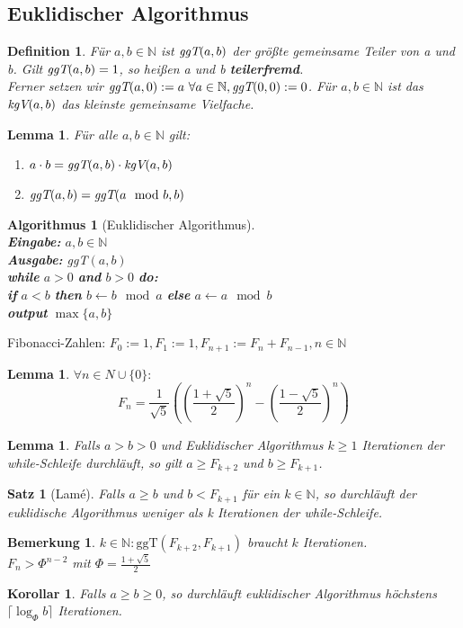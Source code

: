 \documentclass[12pt,a4paper]{article}
\theoremstyle{plain}
\newtheorem{Satz}[Theorem]{Satz}
\newtheorem{Lemma}[Theorem]{Lemma}
\newtheorem{Korollar}[Theorem]{Korollar}
\newtheorem{Definition}[Theorem]{Definition}
\newtheorem{Bemerkung}[Theorem]{Bemerkung}
\newtheorem{Algorithmus}[Theorem]{Algorithmus}
\newcommand{\herv}[1]{{\emph{\textbf{#1}}}}
\newcommand{\N}{\mathbb{N}}
\numberwithin{equation}{section}
\begin{document}
\subsection{Euklidischer Algorithmus}
\begin{Definition}
Für $a,b \in \N$ ist $\emph{ggT}(a,b)$ der größte gemeinsame Teiler von a und b. Gilt $\emph{ggT}(a,b)=1$, so heißen a und b \herv{teilerfremd}.\\
Ferner setzen wir $\emph{ggT}(a,0):=a\  \forall a \in \N, \emph{ggT}(0,0):=0$. Für $a,b\in \N$ ist das $\emph{kgV}(a,b)$ das kleinste gemeinsame Vielfache.
\end{Definition}
\begin{Lemma}
Für alle $a, b \in \N$ gilt:
\renewcommand{\labelenumi}{\emph{(\alph{enumi})}}
\begin{enumerate}
\item $a\cdot b = \emph{ggT}(a,b)\cdot \emph{kgV}(a,b)$
\item $\emph{ggT}(a,b)= \emph{ggT}(a\mod b, b)$
\end{enumerate}
\end{Lemma}
\begin{Algorithmus}[Euklidischer Algorithmus] \\
\textbf{Eingabe:} $a,b\in\N$\\
\textbf{Ausgabe:} ggT$(a,b)$\\
\textbf{while} $a>0$ \textbf{and} $b>0$ \textbf{do:}\\
\text{\qquad}\textbf{if} $a<b$ \textbf{then} $b\leftarrow b\mod a$ \textbf{else} $a\leftarrow a\mod b$\\
\textbf{output} $\max\{a,b\}$
\end{Algorithmus}
Fibonacci-Zahlen: $F_0:=1, F_1:=1, F_{n+1}:=F_n+F_{n-1}, n\in\N$
\begin{Lemma} $\forall n\in N\cup\{0\}:$\\
\[ F_n=\frac{1}{\sqrt{5}}\left(\left(\frac{1+\sqrt{5}}{2}\right)^n-\left(\frac{1-\sqrt{5}}{2}\right)^n \right) \]
\end{Lemma}
\begin{Lemma}
Falls $a>b>0$ und Euklidischer Algorithmus $k\geq 1$ Iterationen der while-Schleife durchläuft, so gilt $a\geq F_{k+2}$ und $b\geq F_{k+1}$.
\end{Lemma}
\begin{Satz}[Lamé] Falls $a\geq b$ und $b<F_{k+1}$ für ein $k\in\N$, so durchläuft der euklidische Algorithmus weniger als k Iterationen der while-Schleife.
\end{Satz}
\begin{Bemerkung}
$k\in\N: \text{ggT}(F_{k+2},F_{k+1})$ braucht $k$ Iterationen.\\
$F_n>\Phi^{n-2}$ mit $\Phi=\frac{1+\sqrt{5}}{2}$
\end{Bemerkung}
\begin{Korollar}
Falls $a\geq b\geq 0$, so durchläuft euklidischer Algorithmus höchstens $\lceil \log_{\Phi}b \rceil$ Iterationen.
\end{Korollar}
\end{document}

